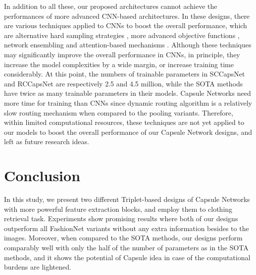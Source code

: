 \documentclass[10pt,twocolumn,letterpaper]{article}
\begin{document}
In addition to all these, our proposed architectures cannot achieve the performances of more advanced CNN-based architectures. In these designs, there are various techniques applied to CNNs to boost the overall performance, which are alternative hard sampling strategies \cite{hdc}, more advanced objective functions \cite{htl,bier}, network ensembling \cite{bier, abe} and attention-based mechanisms \cite{vam,abe}. Although these techniques may significantly improve the overall performance in CNNs, in principle, they increase the model complexities by a wide margin, or increase training time considerably. At this point, the numbers of trainable parameters in SCCapsNet and RCCapsNet are respectively 2.5 and 4.5 million, while the SOTA methods have twice as many trainable parameters in their models. Capsule Networks need more time for training than CNNs since dynamic routing algorithm is a relatively slow routing mechanism when compared to the pooling variants. Therefore, within limited computational resources, these techniques are not yet applied to our models to boost the overall performance of our Capsule Network designs, and left as future research ideas.

\section{Conclusion}


In this study, we present two different Triplet-based designs of Capsule Networks with more powerful feature extraction blocks, and employ them to clothing retrieval task. Experiments show promising results where both of our designs outperform all FashionNet variants without any extra information besides to the images. Moreover, when compared to the SOTA methods, our designs perform comparably well with only the half of the number of parameters as in the SOTA methods, and it shows the potential of Capsule idea in case of the computational burdens are lightened.






{\small


}
\end{document}
